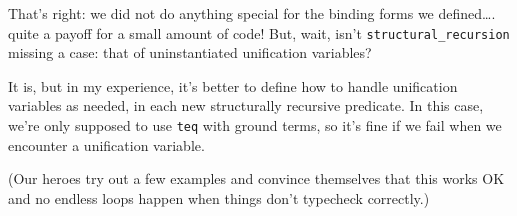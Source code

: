 \heroSTUDENT{} That's right: we did not do anything special for the binding
forms we defined\ldots{}. quite a payoff for a small amount of code!
But, wait, isn't \texttt{structural\_recursion} missing a case: that of
uninstantiated unification variables?

\heroADVISOR{} It is, but in my experience, it's better to define how to
handle unification variables as needed, in each new structurally
recursive predicate. In this case, we're only supposed to use
\texttt{teq} with ground terms, so it's fine if we fail when we
encounter a unification variable.

\begin{scenecomment}
(Our heroes try out a few examples and convince themselves that this works OK and no endless loops happen when things don't typecheck correctly.)
\end{scenecomment}
